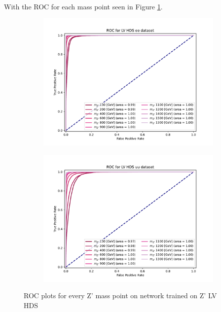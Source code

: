 \documentclass[12pt, a4paper]{book}
\begin{document}
\\With the ROC for each mass point seen in Figure \ref{fig:LV_HDS_ROCS}.
\begin{figure}[!ht]
	\centering
	\begin{subfigure}[b]{0.49\textwidth}
      \centering
      \includegraphics[width=1\textwidth]{XGBoost/LV_HDS/ROC_ee.pdf}
      \end{subfigure}
   \hfill
   \begin{subfigure}[b]{0.49\textwidth}
      \centering
      \includegraphics[width=1\textwidth]{XGBoost/LV_HDS/ROC_uu.pdf}
      \end{subfigure}
   \caption{ROC plots for every Z' mass point on network trained on Z' LV HDS}\label{fig:LV_HDS_ROCS}
\end{figure}
\end{document}
